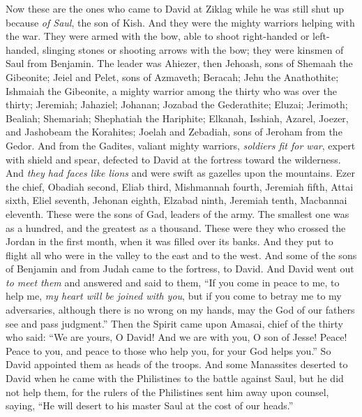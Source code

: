 \begin{biblechapter} %
 Now these are the ones who came to David at Ziklag while he was still shut up because \textit{of Saul}, the son of Kish. And they were the mighty warriors helping with the war.
\verse They were armed with the bow, able to shoot right-handed or left-handed, slinging stones or shooting arrows with the bow; they were kinsmen of Saul from Benjamin.
\verse The leader was Ahiezer, then Jehoash, sons of Shemaah the Gibeonite; Jeiel and Pelet, sons of Azmaveth; Beracah; Jehu the Anathothite;
\verse Ishmaiah the Gibeonite, a mighty warrior among the thirty who was over the thirty; Jeremiah; Jahaziel; Johanan; Jozabad the Gederathite;
\verse  Eluzai; Jerimoth; Bealiah; Shemariah; Shephatiah the Hariphite;
\verse Elkanah, Isshiah, Azarel, Joezer, and Jashobeam the Korahites;
\verse Joelah and Zebadiah, sons of Jeroham from the Gedor.
\verse And from the Gadites, valiant mighty warriors, \textit{soldiers fit for war}, expert with shield and spear, defected to David at the fortress toward the wilderness. And \textit{they had faces like lions} and were swift as gazelles upon the mountains.
\verse Ezer the chief, Obadiah second, Eliab third,
\verse Mishmannah fourth, Jeremiah fifth,
\verse Attai sixth, Eliel seventh,
\verse Jehonan eighth, Elzabad ninth,
\verse Jeremiah tenth, Macbannai eleventh.
\verse These were the sons of Gad, leaders of the army. The smallest one was as a hundred, and the greatest as a thousand.
\verse These were they who crossed the Jordan in the first month, when it was filled over its banks. And they put to flight all who were in the valley to the east and to the west.
\verse And some of the sons of Benjamin and from Judah came to the fortress, to David.
\verse And David went out \textit{to meet them} and answered and said to them, “If you come in peace to me, to help me, \textit{my heart will be joined with you}, but if you come to betray me to my adversaries, although there is no wrong on my hands, may the God of our fathers see and pass judgment.”
\verse Then the Spirit came upon Amasai, chief of the thirty who said: “We are yours, O David! 
And we are with you, O son of Jesse! 
Peace! Peace to you, and peace to those who help you, 
for your God helps you.” So David appointed them as heads of the troops.
\verse And some Manassites deserted to David when he came with the Philistines to the battle against Saul, but he did not help them, for the rulers of the Philistines sent him away upon counsel, saying, “He will desert to his master Saul at the cost of our heads.”

\end{biblechapter}
